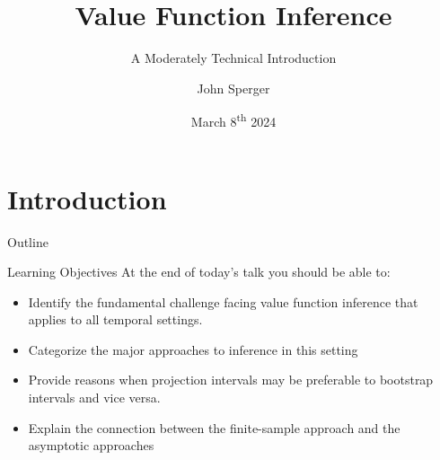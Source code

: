 \documentclass[aspectratio=169, professionalfonts]{beamer}
\author{John Sperger}
\date{March 8\textsuperscript{th} 2024}
\title{Value Function Inference}
\subtitle{A Moderately Technical Introduction}
\begin{document}
\maketitle

\section{Introduction}
\begin{frame}{Outline}
	\tableofcontents[hideallsubsections]
\end{frame}
\begin{frame}[label={overview:objectives}]{Learning Objectives}
	\vfill \pause
	At the end of today's talk you should be able to:
	\begin{itemize}
		\item Identify the fundamental challenge facing value function
		      inference		      that applies to all temporal settings.
		      \vfill \pause


		\item Categorize the major approaches to inference in this setting

		      \vfill \pause

		\item Provide reasons when projection intervals may be preferable to
		      bootstrap intervals and vice versa.
		      \vfill \pause

		\item Explain the connection between the finite-sample approach and the
		      asymptotic approaches
	\end{itemize}
	\vfill
\end{frame}

\end{document}
